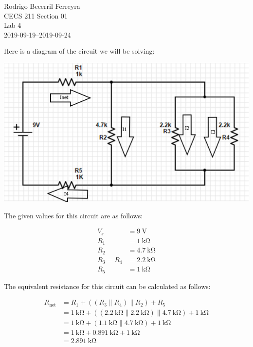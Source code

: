 \documentclass{article}
\begin{document}
    
\begin{flushright}
    \noindent
    Rodrigo Becerril Ferreyra\\
    CECS 211 Section 01\\
    Lab 4\\
    2019-09-19--2019-09-24
\end{flushright}

Here is a diagram of the circuit we will be solving:

\includegraphics[width=\textwidth]{Diagram.png}

The given values for this circuit are as follows:

\begin{align*}
    V_s &= \SI{9}{\volt}\\
    R_1 &= \SI{1}{\kilo\ohm}\\
    R_2 &= \SI{4.7}{\kilo\ohm}\\
    R_3 = R_4 &= \SI{2.2}{\kilo\ohm}\\
    R_5 &= \SI{1}{\kilo\ohm}
\end{align*}

The equivalent resistance for this circuit can be calculated
as follows:

\begin{align*}
    R_{\text{net}} &= R_1 + ((R_3 \parallel R_4) \parallel R_2) + R_5\\
    &= \SI{1}{\kilo\ohm} + ((\SI{2.2}{\kilo\ohm} \parallel \SI{2.2}{\kilo\ohm}) \parallel \SI{4.7}{\kilo\ohm}) + \SI{1}{\kilo\ohm}\\
    &= \SI{1}{\kilo\ohm} + (\SI{1.1}{\kilo\ohm} \parallel \SI{4.7}{\kilo\ohm}) + \SI{1}{\kilo\ohm}\\
    &= \SI{1}{\kilo\ohm} + \SI{0.891}{\kilo\ohm} + \SI{1}{\kilo\ohm}\\
    &= \SI{2.891}{\kilo\ohm}
\end{align*}
\end{document}

